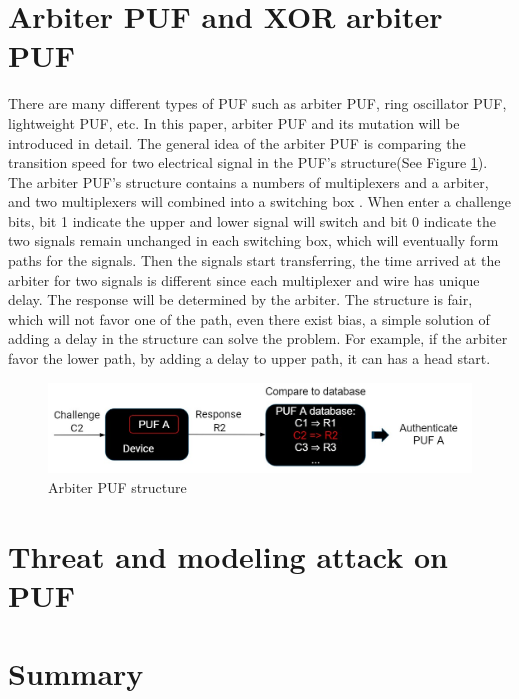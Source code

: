 \section{Arbiter PUF and XOR arbiter PUF}
There are many different types of PUF such as arbiter PUF, ring oscillator PUF, lightweight PUF, etc. In this paper, arbiter PUF and its mutation will be introduced in detail. The general idea of
the arbiter PUF is comparing the transition speed for two electrical signal in the PUF's structure(See Figure \ref{fig:figure6}). The arbiter PUF's structure contains a numbers of 
multiplexers and a arbiter, and two multiplexers will combined into a switching box \cite{Reference3}. When enter a challenge bits, bit 1 indicate the upper and lower signal will switch and bit 0 indicate the two signals remain unchanged in each switching box, which will 
eventually form paths for the signals. Then the signals start transferring, the time arrived at the arbiter for two signals is different since each multiplexer and wire has unique delay. The response will be determined by the arbiter. 
The structure is fair, which will not favor one of the path, even there exist bias, a simple solution of adding a delay in the structure can solve the problem. For example, if the arbiter favor the lower path,
by adding a delay to upper path, it can has a head start.
\begin{figure}[ht]
    \centering
    \includegraphics[width=12cm]{figures/figure5.jpg}
    \caption{Arbiter PUF structure}
    \label{fig:figure6}
    \end{figure}

\section{Threat and modeling attack on PUF}


\section{Summary}


